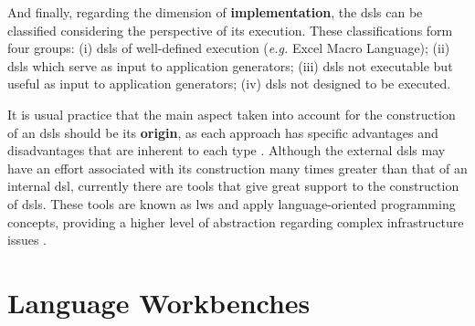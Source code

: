 And finally, regarding the dimension of \textbf{implementation}, the \acp{dsl} can be classified considering the perspective of its execution.
These classifications form four groups:
(i) \acp{dsl} of well-defined execution (\textit{e.g.} Excel Macro Language);
(ii) \acp{dsl} which serve as input to application generators;
(iii) \acp{dsl} not executable but useful as input to application generators;
(iv) \acp{dsl} not designed to be executed.


It is usual practice that the main aspect taken into account for the construction of an \acp{dsl} should be its \textbf{origin}, as each approach has specific advantages and disadvantages that are inherent to each type \cite{Fowler:2010}.
Although the external \acp{dsl} may have an effort associated with its construction many times greater than that of an internal \ac{dsl}, currently there are tools that give great support to the construction of \acp{dsl}.
These tools are known as \acp{lw} and apply language-oriented programming concepts, providing a higher level of abstraction regarding complex infrastructure issues \cite{Fowler:2005}.


\section{Language Workbenches}
\label{sec_back:LangWorkbench}

